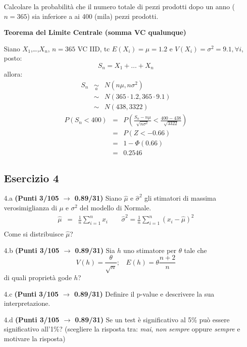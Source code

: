 \documentclass[
  11pt,
]{book}
\theoremstyle{mytheoremstyle}
\theoremstyle{mydefstyle}
\newenvironment{sol}
  {
  \begin{tcolorbox}[enhanced,breakable,arc=0.1mm,boxrule=1pt,colback=white,colframe=iblue,
  title=\bf \fontfamily{lmss}\selectfont \hspace{.5 cm} Soluzione,drop fuzzy shadow]

}{
\end{tcolorbox}
  }
\begin{document}
Calcolare la probabilità che il numero totale di pezzi prodotti dopo un anno (\(n=365\)) sia inferiore a ai 400 (mila) pezzi prodotti.

\begin{sol}
\textbf{Teorema del Limite Centrale (somma VC qualunque)}

Siano \(X_1\),\ldots,\(X_n\), \(n=365\) VC IID, tc \(E(X_i)=\mu=1.2\) e \(V(X_i)=\sigma^2=9.1,\forall i\), posto:
\[
      S_n = X_1 + ... + X_n
      \]
allora:\begin{eqnarray*}
  S_n & \mathop{\sim}\limits_{a}& N(n\mu,n\sigma^2) \\
     &\sim & N(365\cdot1.2,365\cdot9.1) \\
     &\sim & N(438,3322) 
  \end{eqnarray*}\begin{eqnarray*}
      P( S_n   <   400 ) 
        &=& P\left(  \frac { S_n  -  n\mu }{ \sqrt{n\sigma^2} }  <  \frac { 400  -  438 }{\sqrt{ 3322 }} \right)  \\
                 &=& P\left(  Z   <   -0.66 \right) \\    
                 &=&  1-\Phi( 0.66 ) \\ &=&  0.2546 
      \end{eqnarray*}

\end{sol}

\subsection{Esercizio 4}\label{esercizio-4-27}

4.a \textbf{(Punti 3/105 \(\rightarrow\) 0.89/31)} Siano \(\hat \mu\) e \(\hat\sigma^2\) gli stimatori di massima verosimiglianza di \(\mu\) e \(\sigma^2\) del modello di Normale.
\begin{eqnarray*}
  \hat\mu &=&  \frac 1n\sum_{i=1}^nx_i \qquad \hat\sigma^2 =  \frac 1n\sum_{i=1}^n(x_i-\hat\mu)^2\\
\end{eqnarray*}
Come si distribuisce \(\hat\mu\)?

4.b \textbf{(Punti 3/105 \(\rightarrow\) 0.89/31)} Sia \(h\) uno stimatore per \(\theta\) tale che
\[V(h)=\frac\theta {\sqrt{n}};~~~~E(h)=\theta\frac{n+2}{n}\]
di quali proprietà gode \(h\)?

4.c \textbf{(Punti 3/105 \(\rightarrow\) 0.89/31)} Definire il p-value e descrivere la sua interpretazione.

4.d \textbf{(Punti 3/105 \(\rightarrow\) 0.89/31)} Se un test è significativo al 5\% può essere significativo all'1\%? (scegliere la risposta tra: \emph{mai}, \emph{non sempre} oppure \emph{sempre} e motivare la risposta)
\end{document}
